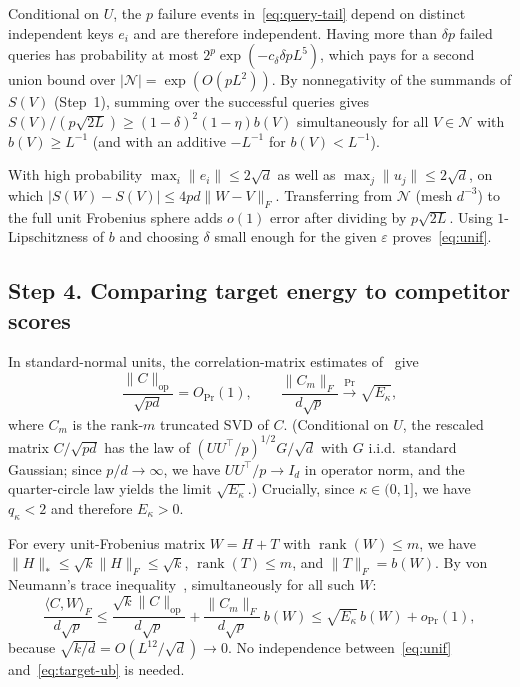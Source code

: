 \documentclass[11pt]{article}
\theoremstyle{plain}
\theoremstyle{definition}
\theoremstyle{remark}
\DeclareMathOperator{\rank}{rank}
\begin{document}
Conditional on $U$, the $p$ failure events in~\eqref{eq:query-tail} depend on distinct independent keys $e_i$ and are therefore independent. Having more than $\delta p$ failed queries has probability at most $2^p \exp(-c_\delta \delta p L^5)$, which pays for a second union bound over $|\mathcal{N}| = \exp(O(p L^2))$. By nonnegativity of the summands of $S(V)$ (Step~1), summing over the successful queries gives $S(V)/(p\sqrt{2L}) \ge (1 - \delta)^2(1 - \eta) b(V)$ simultaneously for all $V \in \mathcal{N}$ with $b(V) \ge L^{-1}$ (and with an additive $-L^{-1}$ for $b(V) < L^{-1}$).

With high probability $\max_i \|e_i\| \le 2\sqrt{d}$ as well as $\max_j \|u_j\| \le 2\sqrt{d}$, on which $|S(W) - S(V)| \le 4pd\|W - V\|_F$. Transferring from $\mathcal{N}$ (mesh $d^{-3}$) to the full unit Frobenius sphere adds $o(1)$ error after dividing by $p\sqrt{2L}$. Using $1$-Lipschitzness of $b$ and choosing $\delta$ small enough for the given $\varepsilon$ proves~\eqref{eq:unif}.

\subsection*{Step 4. Comparing target energy to competitor scores}

In standard-normal units, the correlation-matrix estimates of~\cite{giorlandino2026} give
\[
\frac{\|C\|_{\mathrm{op}}}{\sqrt{pd}} = O_{\Pr}(1),
\qquad
\frac{\|C_m\|_F}{d\sqrt{p}} \xrightarrow{\Pr} \sqrt{E_\kappa},
\]
where $C_m$ is the rank-$m$ truncated SVD of $C$. (Conditional on $U$, the rescaled matrix $C/\sqrt{pd}$ has the law of $(U U^\top/p)^{1/2} G/\sqrt{d}$ with $G$ i.i.d.\ standard Gaussian; since $p/d \to \infty$, we have $U U^\top / p \to I_d$ in operator norm, and the quarter-circle law yields the limit $\sqrt{E_\kappa}$.) Crucially, since $\kappa \in (0, 1]$, we have $q_\kappa < 2$ and therefore $E_\kappa > 0$.

For every unit-Frobenius matrix $W = H + T$ with $\rank(W) \le m$, we have $\|H\|_* \le \sqrt{k}\|H\|_F \le \sqrt{k}$, $\rank(T) \le m$, and $\|T\|_F = b(W)$. By von Neumann's trace inequality~\cite{vonneumann1937}, simultaneously for all such $W$:
\begin{equation}\label{eq:target-ub}
\frac{\langle C, W \rangle_F}{d\sqrt{p}}
\le \frac{\sqrt{k}\|C\|_{\mathrm{op}}}{d\sqrt{p}} + \frac{\|C_m\|_F}{d\sqrt{p}}\, b(W)
\le \sqrt{E_\kappa}\, b(W) + o_{\Pr}(1),
\end{equation}
because $\sqrt{k/d} = O(L^{12}/\sqrt{d}) \to 0$. No independence between~\eqref{eq:unif} and~\eqref{eq:target-ub} is needed.
\end{document}
